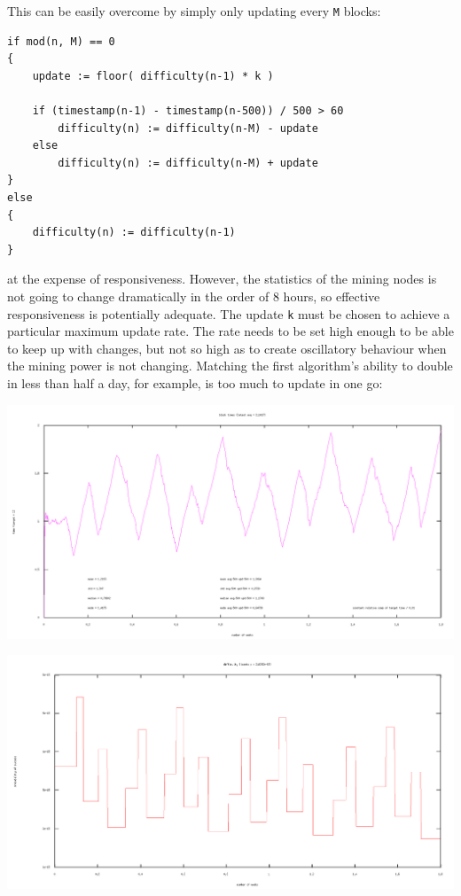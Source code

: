 \documentclass[10pt,a4paper]{article}
\begin{document}
This can be easily overcome by simply only updating every {\tt M} blocks:

\begin{verbatim}
if mod(n, M) == 0
{
    update := floor( difficulty(n-1) * k )

    if (timestamp(n-1) - timestamp(n-500)) / 500 > 60
        difficulty(n) := difficulty(n-M) - update
    else
        difficulty(n) := difficulty(n-M) + update
}
else
{
    difficulty(n) := difficulty(n-1)
}
\end{verbatim}
at the expense of responsiveness. However, the statistics of the mining nodes is not going to change dramatically in the order of 8 hours, so effective responsiveness is potentially adequate. The update {\tt k} must be chosen to achieve a particular maximum update rate. The rate needs to be set high enough to be able to keep up with changes, but not so high as to create oscillatory behaviour when the mining power is not changing. Matching the first algorithm's ability to double in less than half a day, for example, is too much to update in one go:

\includegraphics[width=14cm]{SimulationGraphs/simulation_avg-500_upd-500_p0-5.png}

\includegraphics[width=14cm]{SimulationGraphs/simulation_avg-500_upd-500_p0-5_diff.png}
\end{document}
